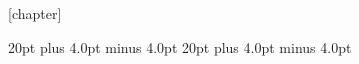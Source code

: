 \usepackage{float}
[chapter]

\newenvironment{framedbox}
    {\begin{infobox} \begin{framed}}
    {\end{framed} \end{infobox}}


\setlength{\textfloatsep}{24pt plus 4.0pt minus 4.0pt}  %
\setlength{\floatsep}    {20pt plus 4.0pt minus 4.0pt}  %
\setlength{\intextsep}   {20pt plus 4.0pt minus 4.0pt}  %

